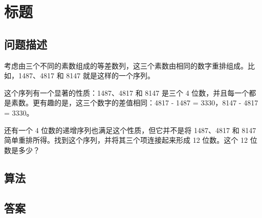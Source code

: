\section{标题}
\subsection{问题描述}
\begin{tcolorbox}
考虑由三个不同的素数组成的等差数列，这三个素数由相同的数字重排组成。比如，1487、4817 和 8147 就是这样的一个序列。

这个序列有一个显著的性质：1487、4817 和 8147 是三个 4 位数，并且每一个都是素数。更有趣的是，这三个数字的差值相同：4817 - 1487 = 3330，8147 - 4817 = 3330。

还有一个 4 位数的递增序列也满足这个性质，但它并不是将 1487、4817 和 8147 简单重排所得。找到这个序列，并将其三个项连接起来形成 12 位数。这个 12 位数是多少？
\end{tcolorbox}

\subsection{算法}


\subsection{答案}

